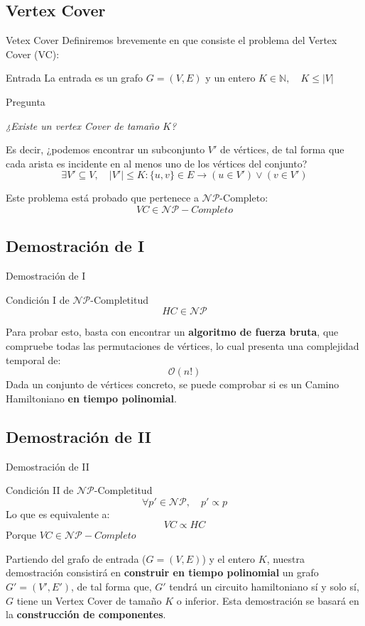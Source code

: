 \documentclass{beamer}
\begin{document}
\subsection{Vertex Cover}
\begin{frame}{Vetex Cover}
    Definiremos brevemente en que consiste el problema del Vertex Cover (VC):
    \begin{block}{Entrada}
        La entrada es un grafo $G = (V, E)$ y un entero $K \in \mathbb{N},  \quad K \le |V|$
    \end{block}
    \begin{block}{Pregunta}
        \begin{center}
            \textit{¿Existe un vertex Cover de tamaño $K$?}
        \end{center}
        Es decir, ¿podemos encontrar un subconjunto $V'$ de vértices, de tal forma que cada arista es incidente en al menos uno de los vértices del conjunto?
        \[ \exists V' \subseteq V, \quad |V'| \le K : \{u,v\} \in E \to (u \in V') \lor (v \in V')\]
    \end{block}
    Este problema está probado que pertenece a $\mathcal{NP}$-Completo:
    \[VC \in \mathcal{NP}-Completo\]
\end{frame}

\subsection{Demostración de I}
\begin{frame}{Demostración de I}
    \begin{block}{Condición I de $\mathcal{NP}$-Completitud}
        \[HC \in \mathcal{NP}\]
    \end{block}
    Para probar esto, basta con encontrar un \textbf{algoritmo de fuerza bruta}, que compruebe todas las permutaciones de vértices, lo cual presenta una complejidad temporal de:
    \[\mathcal{O}(n!)\]
    Dada un conjunto de vértices concreto, se puede comprobar si es un Camino Hamiltoniano \textbf{en tiempo polinomial}.
\end{frame}

\subsection{Demostración de II}
\begin{frame}{Demostración de II}
    \begin{block}{Condición II de $\mathcal{NP}$-Completitud}
        \[\forall p' \in \mathcal{NP}, \quad p' \propto p\]
        Lo que es equivalente a:
        \[VC \propto HC\]
        Porque $VC \in \mathcal{NP}-Completo$
    \end{block}
    Partiendo del grafo de entrada ($G = (V, E)$) y el entero $K$, nuestra demostración consistirá en \textbf{construir en tiempo polinomial} un grafo $G' = (V', E')$, de tal forma que, $G'$ tendrá un circuito hamiltoniano sí y solo sí, $G$ tiene un Vertex Cover de tamaño $K$ o inferior.
    \vfill
    Esta demostración se basará en la \textbf{construcción de componentes}.
\end{frame}
\end{document}
